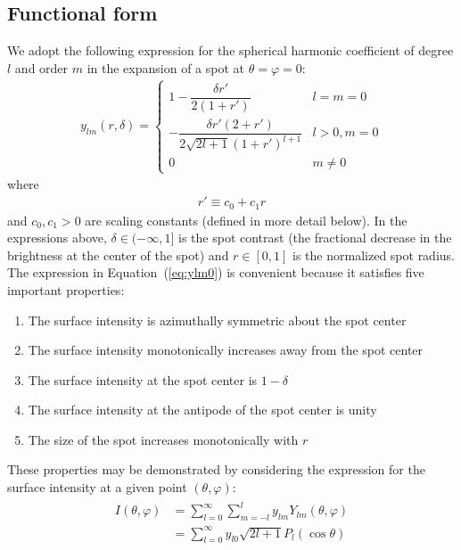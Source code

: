 \documentclass[modern]{aastex62}
\begin{document}
\subsection{Functional form}
%
We adopt the following expression for the spherical harmonic coefficient
of degree $l$ and order $m$ in the expansion of a spot at
$\theta = \varphi = 0$:
%
\begin{align}
    \label{eq:ylm0}
    y_{lm}(r, \delta) =
    \begin{cases}
        1 - \dfrac{\delta r'}{2 (1 + r')}
         & l = m = 0    \\[2em]
        -\dfrac{\delta r' \left( 2 + r' \right)}
        {2 \sqrt{2l + 1} (1 + r')^{l + 1}}
         & l > 0, m = 0 \\[2em]
        0
         & m \ne 0
    \end{cases}
\end{align}
%
where
%
\begin{align}
    \label{eq:rprime}
    r' \equiv c_0 + c_1 r
\end{align}
%
and $c_0, c_1 > 0$ are scaling constants (defined in more detail below).
In the expressions above,
$\delta \in (-\infty, 1]$ is the spot contrast (the fractional
decrease in the brightness
at the center of the spot) and $r \in [0, 1]$ is the normalized spot radius.
The expression in Equation~(\ref{eq:ylm0}) is convenient because it satisfies
five important properties:
%
\begin{enumerate}[itemsep=2pt,parsep=1pt,label=\textbf{\arabic*}]
    \item The surface intensity is azimuthally symmetric about the spot center
    \item The surface intensity monotonically increases away from the spot center
    \item The surface intensity at the spot center is $1 - \delta$
    \item The surface intensity at the antipode of the spot center is unity
    \item The size of the spot increases monotonically with $r$
\end{enumerate}
%
These properties may be demonstrated by considering the expression for the
surface intensity at a given point $(\theta, \varphi)$:
%
\begin{align}
    \begin{split}
        I(\theta, \varphi)
        & =
        \sum\limits_{l=0}^\infty \sum\limits_{m=-l}^l
        y_{lm} Y_{lm}(\theta, \varphi) \\
        & = \sum\limits_{l=0}^\infty
        y_{l0} \sqrt{2l + 1} P_l(\cos\theta)
    \end{split}
\end{align}
\end{document}
